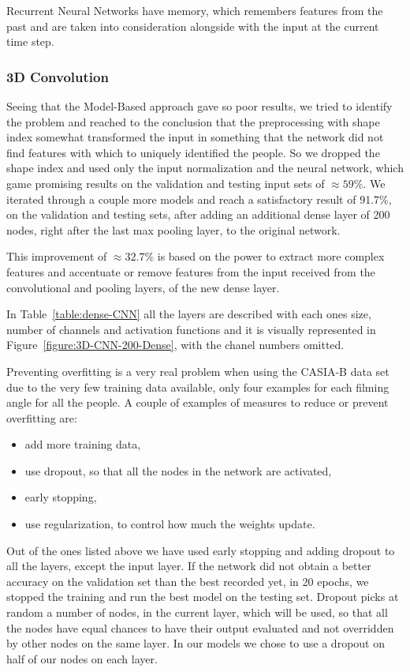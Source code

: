 \documentclass[12pt]{article}
\theoremstyle{definition}
\begin{document}
	Recurrent Neural Networks have memory, which remembers features from the past and are taken into consideration alongside with the input at the current time step.

	\subsubsection{3D Convolution}

	Seeing that the Model-Based approach gave so poor results, we tried to identify the problem and reached to the conclusion that the preprocessing with shape index somewhat transformed the input in something that the network did not find features with which to uniquely identified the people. So we dropped the shape index and used only the input normalization and the neural network, which game promising results on the validation and testing input sets of $\approx 59\%$. We iterated through a couple more models and reach a satisfactory result of 91.7\%, on the validation and testing sets, after adding an additional dense layer of 200 nodes, right after the last max pooling layer, to the original network.

	This improvement of $\approx 32.7\%$ is based on the power to extract more complex features and accentuate or remove features from the input received from the convolutional and pooling layers, of the new dense layer.

	In Table~\ref{table:dense-CNN} all the layers are described with each ones size, number of channels and activation functions and it is visually represented in Figure~\ref{figure:3D-CNN-200-Dense}, with the chanel numbers omitted.

	Preventing overfitting is a very real problem when using the CASIA-B data set \cite{casia1}\cite{casia2}\cite{casia3} due to the very few training data available, only four examples for each filming angle for all the people. A couple of examples of measures to reduce or prevent overfitting are:
	\begin{itemize}
		\item add more training data,
		\item use dropout, so that all the nodes in the network are activated,
		\item early stopping,
		\item use regularization, to control how much the weights update.
	\end{itemize}

	Out of the ones listed above we have used early stopping and adding dropout to all the layers, except the input layer. If the network did not obtain a better accuracy on the validation set than the best recorded yet, in 20 epochs, we stopped the training and run the best model on the testing set. Dropout picks at random a number of nodes, in the current layer, which will be used, so that all the nodes have equal chances to have their output evaluated and not overridden by other nodes on the same layer. In our models we chose to use a dropout on half of our nodes on each layer.
\end{document}
